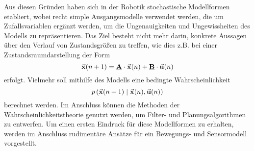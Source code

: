 Aus diesen Gründen haben sich in der Robotik stochastische Modellformen etabliert, wobei recht simple Ausgangsmodelle verwendet werden, die um Zufallsvariablen ergänzt werden, um die Ungenauigkeiten und Ungewissheiten des Modells zu repräsentieren. Das Ziel besteht nicht mehr darin, konkrete Aussagen über den Verlauf von Zustandsgrößen zu treffen, wie dies z.B. bei einer Zustandsraumdarstellung der Form
\begin{equation}
\vec{\mathbf{x}}(n+1) = \mathbf{\underline{{{A}}}}\cdot \vec{\mathbf{x}}(n) + \mathbf{\underline{{B}}}\cdot \vec{\mathbf{\mathbf{u}}}(n)
\end{equation}
erfolgt. Vielmehr soll mithilfe des Modells eine bedingte Wahrscheinlichkeit
\begin{equation}
p\left({\vec{\mathbf{x}}(n+1)} \hspace{1mm} \vert \hspace{1mm} {\vec{\mathbf{x}}(n), \vec{\mathbf{u}}(n)}\right)
\end{equation}
berechnet werden. Im Anschluss können die Methoden der Wahrscheinlichkeitstheorie genutzt werden, um Filter- und Planungsalgorithmen zu entwerfen. Um einen ersten Eindruck für diese Modellformen zu erhalten, werden im Anschluss rudimentäre Ansätze für ein Bewegungs- und Sensormodell vorgestellt.


\newpage

\newpage

\newpage
